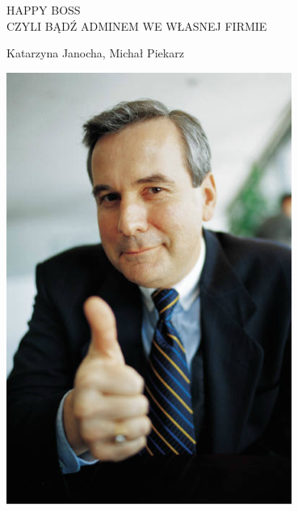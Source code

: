 \documentclass[b5paper,11pt,final]{article}
\begin{document}
\begin{titlepage}
\begin{center}



\LARGE{HAPPY BOSS
\\CZYLI BĄDŹ ADMINEM WE WŁASNEJ FIRMIE}

\large{Katarzyna Janocha, Michał Piekarz~\\[1cm]}



\includegraphics[width=0.7\textwidth]{boss.png}
\newpage
\tableofcontents


\end{center}
\end{titlepage}













\end{document}
